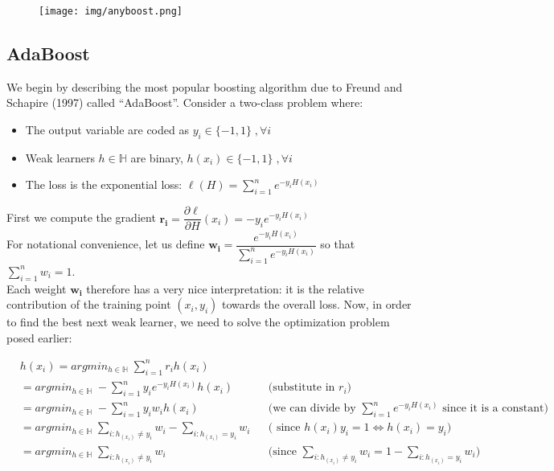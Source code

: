 \documentclass[twoside]{article}
\begin{document}
\begin{figure}[h]
\centering
\texttt{[image: img/anyboost.png]}
\end{figure}

\subsection{AdaBoost}

We begin by describing the most popular boosting algorithm due to
Freund and Schapire (1997) called “AdaBoost”. Consider a two-class
problem where:
\begin{itemize}
    \item The output variable are coded as $y_{i} \in \{ -1, 1\} \; , \forall i $
    \item Weak learners $h \in \mathbb{H}$ are binary, $h(x_{i}) \in \{-1,1\} \; , \forall i$
    \item The loss is the exponential loss: $\ell(H) = \sum_{i=1}^{n} e^{-y_{i}H(x_{i})}$
\end{itemize}

First we compute the gradient $\mathbf{r_{i}} = \dfrac{\partial \ell}{\partial H} (x_{i}) = -y_{i}e^{-y_{i}H(x_{i})} $ \\
For notational convenience, let us define $ \mathbf{w_{i}} = \dfrac{e^{-y_{i}H(x_{i})}}{\sum_{i=1}^{n} e^{-y_{i}H(x_{i})}} $ so that $\sum_{i=1}^{n}w_{i} = 1$.  \\
Each weight $\mathbf{w_{i}}$ therefore has a very nice interpretation: it is the relative contribution of the training point $(x_{i},y_{i})$ towards the overall loss. Now, in order to find the best next weak learner, we need to solve the optimization problem posed earlier:



\begin{equation*}
\begin{aligned}
&   h(x_{i}) = argmin_{h \in \mathbb{H}} \; \sum_{i=1}^{n} r_{i} h(x_{i}) 
  \\
  &= argmin_{h \in \mathbb{H}} \; -\sum_{i=1}^{n} y_{i}e^{-y_{i}H(x_{i})} h(x_{i}) && \text{(substitute in $r_{i}$)}\\
&  = argmin_{h \in \mathbb{H}} \; -\sum_{i=1}^{n} y_{i}w_{i} h(x_{i}) &&  \text{(we can divide by $\sum_{i=1}^{n} e^{-y_{i}H(x_{i})}$ since it is a constant)} \\
& = argmin_{h \in \mathbb{H}} \; \sum_{i: h_(x_{i}) \not = y_{i}} w_{i} - \sum_{i: h_(x_{i})  = y_{i}} w_{i} && \text{( since $h(x_{i})y_{i} = 1 \iff h(x_{i}) = y_{i} $)} \\
& = argmin_{h \in \mathbb{H}} \; \sum_{i: h_(x_{i}) \not = y_{i}} w_{i} && \text{(since $\sum_{i: h_(x_{i}) \not = y_{i}} w_{i} = 1 - \sum_{i: h_(x_{i})  = y_{i}} w_{i}$)}
\end{aligned}
\end{equation*}
\end{document}
